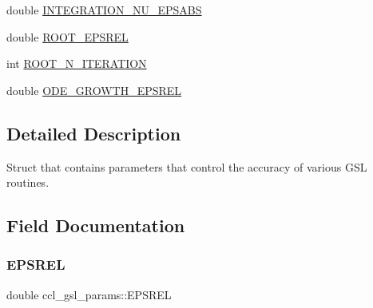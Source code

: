 \begin{DoxyCompactItemize}
\item 
double \mbox{\hyperlink{structccl__gsl__params_a8bbd0ec8bd415ee2570291ea1aa28fd6}{I\+N\+T\+E\+G\+R\+A\+T\+I\+O\+N\+\_\+\+N\+U\+\_\+\+E\+P\+S\+A\+BS}}
\item 
double \mbox{\hyperlink{structccl__gsl__params_a05a7e4f6e9ce2c8697d6092de33ecf34}{R\+O\+O\+T\+\_\+\+E\+P\+S\+R\+EL}}
\item 
int \mbox{\hyperlink{structccl__gsl__params_a9d13f40efe43c9eec1ea1f3c74798a47}{R\+O\+O\+T\+\_\+\+N\+\_\+\+I\+T\+E\+R\+A\+T\+I\+ON}}
\item 
double \mbox{\hyperlink{structccl__gsl__params_a17b67de63575e4dcf03a67a68ad527e7}{O\+D\+E\+\_\+\+G\+R\+O\+W\+T\+H\+\_\+\+E\+P\+S\+R\+EL}}
\end{DoxyCompactItemize}


\subsection{Detailed Description}
Struct that contains parameters that control the accuracy of various G\+SL routines. 

\subsection{Field Documentation}
\mbox{\label{structccl__gsl__params_adb9fee16dc600f05838baead9d45bc12}} 
\subsubsection{\texorpdfstring{E\+P\+S\+R\+EL}{EPSREL}}
{\footnotesize\ttfamily double ccl\+\_\+gsl\+\_\+params\+::\+E\+P\+S\+R\+EL}

\mbox{\label{structccl__gsl__params_ac4e4045cb45a81212b56965e1992681f}} 
